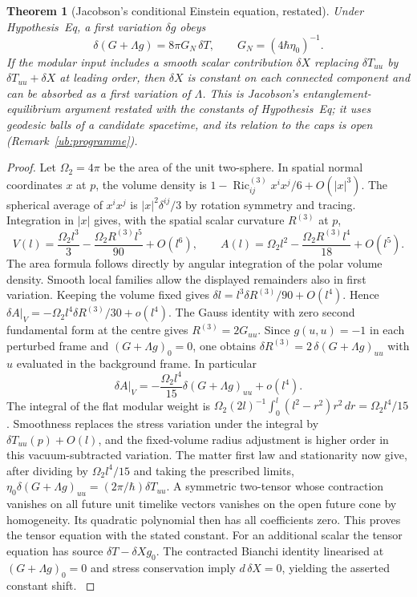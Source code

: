 \documentclass[aps,pra,onecolumn,superscriptaddress,nofootinbib,10pt]{revtex4-2}
\newtheorem{theorem}{Theorem}
\theoremstyle{definition}
\theoremstyle{remark}
\begin{document}
\begin{theorem}[Jacobson's conditional Einstein equation, restated]\label{ub:einstein}
Under Hypothesis~Eq, a first variation $\delta g$
obeys
\[
 \delta(G+\Lambda g)=8\pi G_N\,\delta T,\qquad
 G_N=(4\hbar\eta_0)^{-1}.
\]
If the modular input includes a smooth scalar contribution
$\delta X$ replacing $\delta T_{uu}$ by $\delta T_{uu}+\delta X$ at
leading order, then $\delta X$ is constant on each connected
component and can be absorbed as a first variation of $\Lambda$.  This is Jacobson's entanglement-equilibrium
argument \cite{ub:jac16} restated with the constants of Hypothesis~Eq; it uses geodesic balls of a candidate
spacetime, and its relation to the caps is open (Remark~\ref{ub:programme}).
\end{theorem}
\begin{proof}
Let $\Omega_2=4\pi$ be the area of the unit two-sphere. In spatial
normal coordinates $x$ at $p$, the volume density is
$1-\operatorname{Ric}^{(3)}_{ij}x^ix^j/6+O(|x|^3)$.
The spherical average of $x^ix^j$ is
$|x|^2\delta^{ij}/3$ by rotation symmetry and tracing.
Integration in $|x|$ gives, with the spatial scalar curvature
$R^{(3)}$ at $p$,
\[
 V(l)=\frac{\Omega_2 l^3}{3}-\frac{\Omega_2 R^{(3)}l^5}{90}+O(l^6),
 \qquad
 A(l)=\Omega_2 l^2-\frac{\Omega_2 R^{(3)}l^4}{18}+O(l^5).
\]
The area formula follows directly by angular integration of the
polar volume density. Smooth local families allow the displayed
remainders also in first variation.
Keeping the volume fixed gives
$\delta l= l^3\delta R^{(3)}/90+O(l^4)$.
Hence $\delta A|_V=-\Omega_2 l^4\delta R^{(3)}/30+o(l^4)$.
The Gauss identity with zero second fundamental form at the centre
gives $R^{(3)}=2G_{uu}$. Since $g(u,u)=-1$ in each perturbed
frame and $(G+\Lambda g)_0=0$, one obtains
$\delta R^{(3)}=2\,\delta(G+\Lambda g)_{uu}$ with $u$ evaluated
in the background frame. In particular
\[
 \delta A|_V=-\frac{\Omega_2 l^4}{15}\delta(G+\Lambda g)_{uu}
                 +o(l^4).
\]
The integral of the flat modular weight is
$\Omega_2(2l)^{-1}\int_0^l (l^2-r^2)r^2\,dr
=\Omega_2 l^4/15$.
Smoothness replaces the stress variation under the integral by
$\delta T_{uu}(p)+O(l)$, and the fixed-volume radius adjustment is
higher order in this vacuum-subtracted variation. The matter first
law and stationarity now give, after dividing by $\Omega_2 l^4/15$
and taking the prescribed limits,
$\eta_0\delta(G+\Lambda g)_{uu}=(2\pi/\hbar)\delta T_{uu}$.
A symmetric two-tensor whose contraction vanishes on all future
unit timelike vectors vanishes on the open future cone by
homogeneity. Its quadratic polynomial then has all coefficients
zero. This proves the tensor equation with the stated constant.
For an additional scalar the tensor equation has source
$\delta T-\delta Xg_0$. The contracted Bianchi identity linearised
at $(G+\Lambda g)_0=0$ and stress conservation imply
$d\,\delta X=0$, yielding the asserted constant shift.
\cite{ub:jac16,n1-jacobson}
\end{proof}
\end{document}
